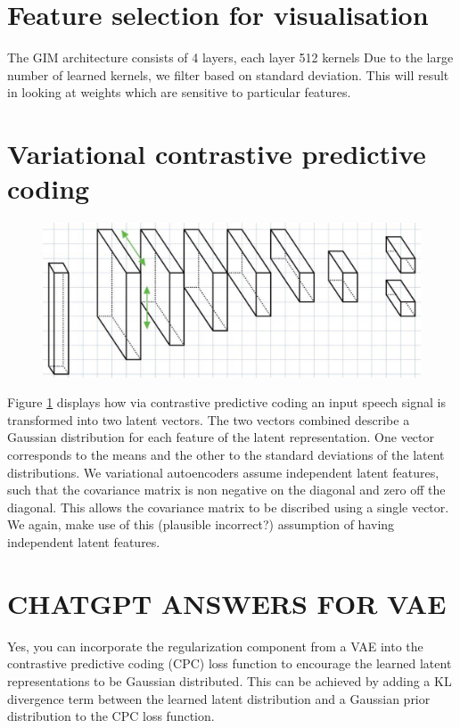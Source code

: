 \section{Feature selection for visualisation}
The GIM architecture consists of 4 layers, each layer 512 kernels
Due to the large number of learned kernels, we filter based on standard deviation. This will result in looking at weights which are sensitive to particular features.


\section{Variational contrastive predictive coding}
\begin{figure}[h]
	\centering
	\includegraphics[width=0.7\linewidth]{architecture}
	\caption{}
	\label{fig:architecture}
\end{figure}
Figure \ref{fig:architecture} displays how via contrastive predictive coding an input speech signal is transformed into two latent vectors. The two vectors combined describe a Gaussian distribution for each feature of the latent representation. One vector corresponds to the means and the other to the standard deviations of the latent distributions. We variational autoencoders assume independent latent features, such that the covariance matrix is non negative on the diagonal and zero off the diagonal. This allows the covariance matrix to be discribed using a single vector. We again, make use of this (plausible incorrect?) assumption of having independent latent features.


\section{CHATGPT ANSWERS FOR VAE}
Yes, you can incorporate the regularization component from a VAE into the contrastive predictive coding (CPC) loss function to encourage the learned latent representations to be Gaussian distributed. This can be achieved by adding a KL divergence term between the learned latent distribution and a Gaussian prior distribution to the CPC loss function.

